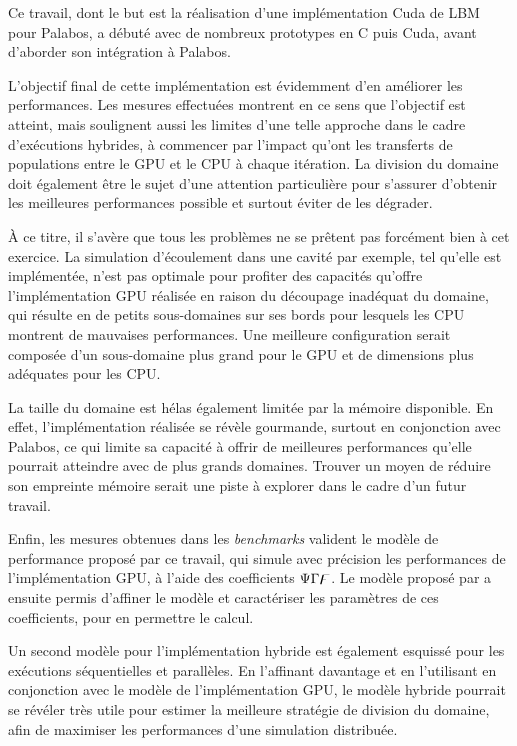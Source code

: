 Ce travail, dont le but est la réalisation d'une implémentation Cuda de \acs{LBM} pour Palabos, a débuté avec de nombreux prototypes en C puis Cuda, avant d'aborder son intégration à Palabos.

L'objectif final de cette implémentation est évidemment d'en améliorer les performances. Les mesures effectuées montrent en ce sens que l'objectif est atteint, mais soulignent aussi les limites d'une telle approche dans le cadre d'exécutions hybrides, à commencer par l'impact qu'ont les transferts de populations entre le \acs{GPU} et le \acs{CPU} à chaque itération. La division du domaine doit également être le sujet d'une attention particulière pour s'assurer d'obtenir les meilleures performances possible et surtout éviter de les dégrader.

À ce titre, il s'avère que tous les problèmes ne se prêtent pas forcément bien à cet exercice. La simulation d'écoulement dans une cavité par exemple, tel qu'elle est implémentée, n'est pas optimale pour profiter des capacités qu'offre l'implémentation \acs{GPU} réalisée en raison du découpage inadéquat du domaine, qui résulte en de petits sous-domaines sur ses bords pour lesquels les \acs{CPU} montrent de mauvaises performances. Une meilleure configuration serait composée d'un sous-domaine plus grand pour le \acs{GPU} et de dimensions plus adéquates pour les \acs{CPU}.

La taille du domaine est hélas également limitée par la mémoire disponible. En effet, l'implémentation réalisée se révèle gourmande, surtout en conjonction avec Palabos, ce qui limite sa capacité à offrir de meilleures performances qu'elle pourrait atteindre avec de plus grands domaines. Trouver un moyen de réduire son empreinte mémoire serait une piste à explorer dans le cadre d'un futur travail.

Enfin, les mesures obtenues dans les \textit{benchmarks} valident le modèle de performance proposé par ce travail, qui simule avec précision les performances de l'implémentation \acs{GPU}, à l'aide des coefficients $\Psi\Gamma\digamma$. Le modèle proposé par \citet{albuquerque_performance_2012} a ensuite permis d'affiner le modèle et caractériser les paramètres de ces coefficients, pour en permettre le calcul. 

Un second modèle pour l'implémentation hybride est également esquissé pour les exécutions séquentielles et parallèles. En l'affinant davantage et en l'utilisant en conjonction avec le modèle de l'implémentation \acs{GPU}, le modèle hybride pourrait se révéler très utile pour estimer la meilleure stratégie de division du domaine, afin de maximiser les performances d'une simulation distribuée.